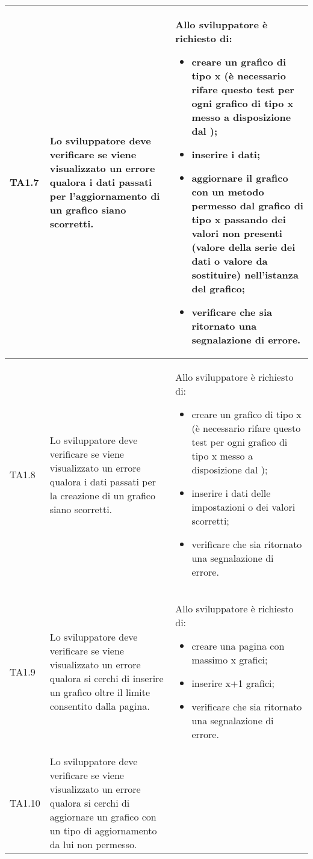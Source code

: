 \begin{longtabu}{| X[0.5] | X | X |}
	TA1.7 & Lo sviluppatore deve verificare se viene visualizzato un errore qualora i dati passati per l'aggiornamento di un grafico siano scorretti.

		& Allo sviluppatore è richiesto di:
		\begin{itemize}
			\item creare un grafico di tipo x (è necessario rifare questo test per ogni grafico di tipo x messo a disposizione dal );
			\item inserire i dati;
			\item aggiornare il grafico con un metodo permesso dal grafico  di tipo x passando dei valori non presenti (valore della serie dei dati o valore da sostituire) nell'istanza del grafico;
			\item verificare che sia ritornato una segnalazione di errore.
		\end{itemize}
\\ \hline

	TA1.8 & Lo sviluppatore deve verificare se viene visualizzato un errore qualora i dati passati per la creazione di un grafico siano scorretti.

		& Allo sviluppatore è richiesto di:
		\begin{itemize}
			\item creare un grafico di tipo x (è necessario rifare questo test per ogni grafico di tipo x messo a disposizione dal );
			\item inserire i dati delle impostazioni o dei valori scorretti;
			\item verificare che sia ritornato una segnalazione di errore.
		\end{itemize}
\\ \hline

	TA1.9 & Lo sviluppatore deve verificare se viene visualizzato un errore qualora si cerchi di inserire un grafico oltre il limite consentito dalla pagina.

		& Allo sviluppatore è richiesto di:
		\begin{itemize}
			\item creare una pagina con massimo x grafici;
			\item inserire x+1 grafici;
			\item verificare che sia ritornato una segnalazione di errore.
		\end{itemize}
\\ \hline

	TA1.10 & Lo sviluppatore deve verificare se viene visualizzato un errore qualora si cerchi di aggiornare un grafico con un tipo di aggiornamento da lui non permesso.


\end{longtabu}
